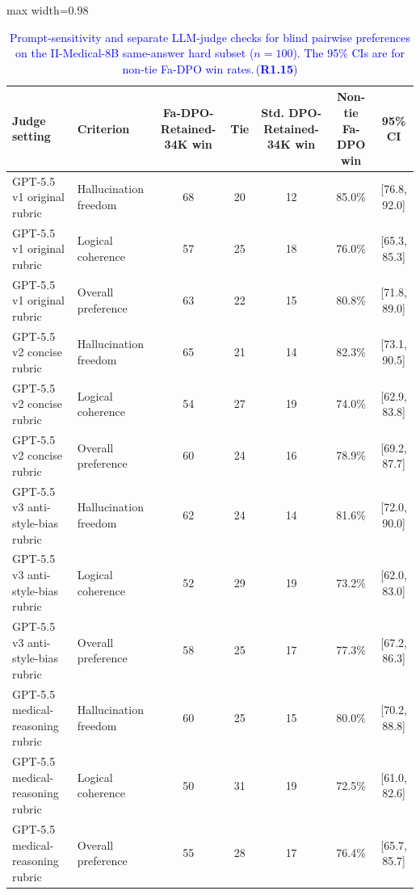 \documentclass[a4paper,fleqn,doubleblind]{cas-sc}
\DeclareRobustCommand{\added}[1]{\textcolor{blue}{#1}}
\DeclareRobustCommand{\revtag}[1]{\textcolor{blue}{\scriptsize\,(\textbf{#1})}}
\begin{document}
\begin{table}[htbp]
    \centering
    \footnotesize
    \caption{\added{Prompt-sensitivity and separate LLM-judge checks for blind pairwise preferences on the II-Medical-8B same-answer hard subset ($n=100$). The 95\% CIs are for non-tie Fa-DPO win rates.}\revtag{R1.15}}
    \label{tab:llm_judge_robustness}
    \begin{adjustbox}{max width=0.98\textwidth}
    \begingroup\color{blue}
    \begin{tabular}{llccccc}
        \toprule
        \textbf{Judge setting} & \textbf{Criterion} & \textbf{Fa-DPO-Retained-34K win} & \textbf{Tie} & \textbf{Std. DPO-Retained-34K win} & \textbf{Non-tie Fa-DPO win} & \textbf{95\% CI} \\
        \midrule
        GPT-5.5 v1 original rubric & Hallucination freedom & 68 & 20 & 12 & 85.0\% & [76.8, 92.0] \\
        GPT-5.5 v1 original rubric & Logical coherence & 57 & 25 & 18 & 76.0\% & [65.3, 85.3] \\
        GPT-5.5 v1 original rubric & Overall preference & 63 & 22 & 15 & 80.8\% & [71.8, 89.0] \\
        GPT-5.5 v2 concise rubric & Hallucination freedom & 65 & 21 & 14 & 82.3\% & [73.1, 90.5] \\
        GPT-5.5 v2 concise rubric & Logical coherence & 54 & 27 & 19 & 74.0\% & [62.9, 83.8] \\
        GPT-5.5 v2 concise rubric & Overall preference & 60 & 24 & 16 & 78.9\% & [69.2, 87.7] \\
        GPT-5.5 v3 anti-style-bias rubric & Hallucination freedom & 62 & 24 & 14 & 81.6\% & [72.0, 90.0] \\
        GPT-5.5 v3 anti-style-bias rubric & Logical coherence & 52 & 29 & 19 & 73.2\% & [62.0, 83.0] \\
        GPT-5.5 v3 anti-style-bias rubric & Overall preference & 58 & 25 & 17 & 77.3\% & [67.2, 86.3] \\
        GPT-5.5 medical-reasoning rubric & Hallucination freedom & 60 & 25 & 15 & 80.0\% & [70.2, 88.8] \\
        GPT-5.5 medical-reasoning rubric & Logical coherence & 50 & 31 & 19 & 72.5\% & [61.0, 82.6] \\
        GPT-5.5 medical-reasoning rubric & Overall preference & 55 & 28 & 17 & 76.4\% & [65.7, 85.7] \\
        \bottomrule
    \end{tabular}
    \endgroup
    \end{adjustbox}
\end{table}
\end{document}
